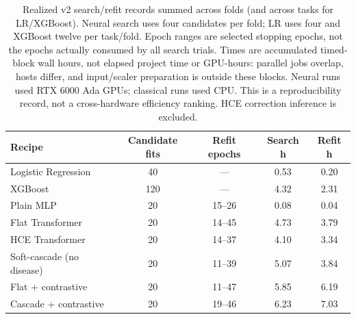 \begin{table}[H]
\centering\small
\setlength{\tabcolsep}{4pt}
\begin{tabular}{lcccc}
\toprule
Recipe & Candidate fits & Refit epochs & Search h & Refit h \\
\midrule
Logistic Regression & 40 & --- & 0.53 & 0.20 \\
XGBoost & 120 & --- & 4.32 & 2.31 \\
Plain MLP & 20 & 15--26 & 0.08 & 0.04 \\
Flat Transformer & 20 & 14--45 & 4.73 & 3.79 \\
HCE Transformer & 20 & 14--37 & 4.10 & 3.34 \\
Soft-cascade (no disease) & 20 & 11--39 & 5.07 & 3.84 \\
Flat + contrastive & 20 & 11--47 & 5.85 & 6.19 \\
Cascade + contrastive & 20 & 19--46 & 6.23 & 7.03 \\
\bottomrule
\end{tabular}
\caption{Realized v2 search/refit records summed across folds (and across tasks for LR/XGBoost). Neural search uses four candidates per fold; LR uses four and XGBoost twelve per task/fold. Epoch ranges are selected stopping epochs, not the epochs actually consumed by all search trials. Times are accumulated timed-block wall hours, not elapsed project time or GPU-hours: parallel jobs overlap, hosts differ, and input/scaler preparation is outside these blocks. Neural runs used RTX 6000 Ada GPUs; classical runs used CPU. This is a reproducibility record, not a cross-hardware efficiency ranking. HCE correction inference is excluded.}
\label{tab:unified_compute}
\end{table}
